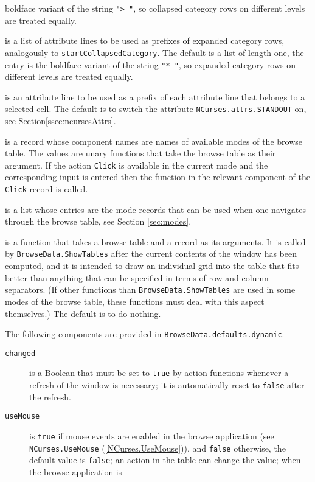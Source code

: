 \documentclass[a4paper,11pt]{report}
\begin{document}
{{{\begin{description}
boldface variant of the string \texttt{"{\textgreater} "}, so collapsed category rows on different levels are treated equally. 
\item[{\texttt{startExpandedCategory}}]  is a list of attribute lines to be used as prefixes of expanded category rows,
analogously to \texttt{startCollapsedCategory}. The default is a list of length one, the entry is the boldface variant of
the string \texttt{"* "}, so expanded category rows on different levels are treated equally. 
\item[{\texttt{startSelect}}]  is an attribute line to be used as a prefix of each attribute line that
belongs to a selected cell. The default is to switch the attribute \texttt{NCurses.attrs.STANDOUT} on, see Section{\nobreakspace}\ref{ssec:ncursesAttrs}. 
\item[{\texttt{Click}}]  is a record whose component names are names of available modes of the browse
table. The values are unary functions that take the browse table as their
argument. If the action \texttt{Click} is available in the current mode and the corresponding input is entered then
the function in the relevant component of the \texttt{Click} record is called. 
\item[{\texttt{availableModes}}]  is a list whose entries are the mode records that can be used when one
navigates through the browse table, see Section \ref{sec:modes}. 
\item[{\texttt{SpecialGrid}}]  is a function that takes a browse table and a record as its arguments. It is
called by \texttt{BrowseData.ShowTables} after the current contents of the window has been computed, and it is intended
to draw an individual grid into the table that fits better than anything that
can be specified in terms of row and column separators. (If other functions
than \texttt{BrowseData.ShowTables} are used in some modes of the browse table, these functions must deal with
this aspect themselves.) The default is to do nothing. 
\end{description}
  The following components are provided in \texttt{BrowseData.defaults.dynamic}. 
\begin{description}
\item[{\texttt{changed}}]  is a Boolean that must be set to \texttt{true} by action functions whenever a refresh of the window is necessary; it is
automatically reset to \texttt{false} after the refresh. 
\item[{\texttt{useMouse}}]  is \texttt{true} if mouse events are enabled in the browse application (see \texttt{NCurses.UseMouse} (\ref{NCurses.UseMouse})), and \texttt{false} otherwise, the default value is \texttt{false}; an action in the table can change the value; when the browse application is

\end{description}}}}
\end{document}
